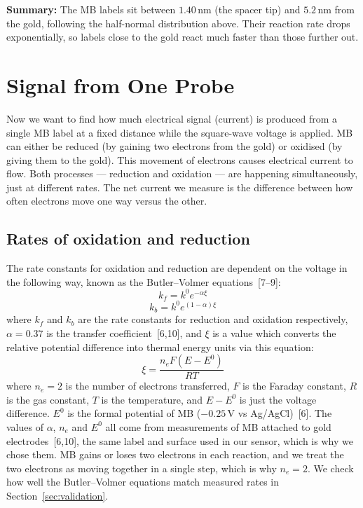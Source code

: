 \documentclass[10pt,a4paper]{article}
\numberwithin{equation}{section}
\newcommand{\cit}[1]{[#1]}
\newcommand{\nm}{\,\mathrm{nm}}
\begin{document}
\textbf{Summary:} The MB labels sit between $1.40\nm$ (the spacer tip) and $5.2\nm$ from the gold, following the half-normal distribution above. Their reaction rate drops exponentially, so labels close to the gold react much faster than those further out.

\section{Signal from One Probe}

Now we want to find how much electrical signal (current) is produced from a single MB label at a fixed distance while the square-wave voltage is applied. MB can either be reduced (by gaining two electrons from the gold) or oxidised (by giving them to the gold). This movement of electrons causes electrical current to flow. Both processes --- reduction and oxidation --- are happening simultaneously, just at different rates. The net current we measure is the difference between how often electrons move one way versus the other.

\subsection{Rates of oxidation and reduction}
The rate constants for oxidation and reduction are dependent on the voltage in the following way, known as the Butler--Volmer equations~\cit{7--9}:
\[ k_f = k^0e^{-\alpha\xi} \]
\[ k_b = k^0e^{(1-\alpha)\xi} \]
where $k_f$ and $k_b$ are the rate constants for reduction and oxidation respectively, $\alpha = 0.37$ is the transfer coefficient~\cit{6,10}, and $\xi$ is a value which converts the relative potential difference into thermal energy units via this equation:
\[ \xi = \frac{n_eF(E - E^0)}{RT} \]
where $n_e = 2$ is the number of electrons transferred, $F$ is the Faraday constant, $R$ is the gas constant, $T$ is the temperature, and $E - E^0$ is just the voltage difference. $E^0$ is the formal potential of MB ($-0.25\,\mathrm{V}$ vs Ag/AgCl)~\cit{6}. The values of $\alpha$, $n_e$ and $E^0$ all come from measurements of MB attached to gold electrodes~\cit{6,10}, the same label and surface used in our sensor, which is why we chose them. MB gains or loses two electrons in each reaction, and we treat the two electrons as moving together in a single step, which is why $n_e = 2$. We check how well the Butler--Volmer equations match measured rates in Section~\ref{sec:validation}.
\end{document}
